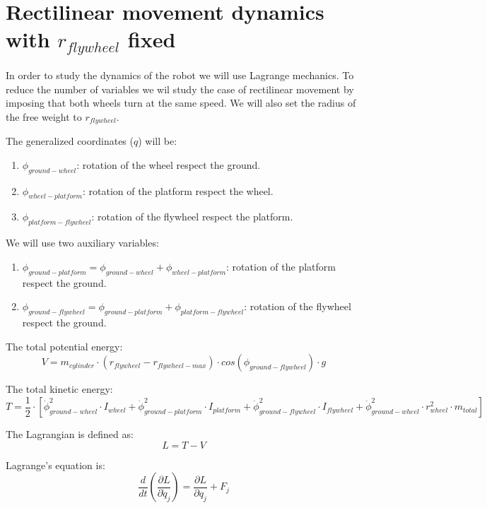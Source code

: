 \section{Rectilinear movement dynamics with $r_{flywheel}$ fixed}

In order to study the dynamics of the robot we will use Lagrange mechanics.
To reduce the number of variables we wil study the case of rectilinear
movement by imposing that both wheels turn at the same speed. We will also set
the radius of the free weight to $r_{flywheel}$.

The generalized coordinates ($q$) will be:
\begin{enumerate}
	\item $\phi_{ground-wheel}$: rotation of the wheel respect the ground.
	\item $\phi_{wheel-platform}$: rotation of the platform respect the wheel.
	\item $\phi_{platform-flywheel}$: rotation of the flywheel respect the platform.
\end{enumerate}

We will use two auxiliary variables:
\begin{enumerate}
	\item $\phi_{ground-platform}=\phi_{ground-wheel}+\phi_{wheel-platform}$: rotation of the platform respect the ground.
	\item $\phi_{ground-flywheel}=\phi_{ground-platform}+\phi_{platform-flywheel}$: rotation of the flywheel respect the ground.
\end{enumerate}

The total potential energy:
\begin{equation}
	V = m_{cylinder}\cdot (r_{flywheel}-r_{flywheel-max}) \cdot cos(\phi_{ground-flywheel}) \cdot g
\end{equation}


The total kinetic energy:
\begin{equation}
	T = \frac{1}{2}\cdot[\dot{\phi}_{ground-wheel}^2\cdot I_{wheel}
		+ \dot{\phi}_{ground-platform}^2 \cdot I_{platform}
		+ \dot{\phi}_{ground-flywheel}^2\cdot I_{flywheel}
		+ \dot{\phi}_{ground-wheel}^2\cdot r_{wheel}^2\cdot m_{total}]
\end{equation}

The Lagrangian is defined as:
\begin{equation}
	L=T-V
\end{equation}

Lagrange's equation is:
\begin{equation}
	\frac{d}{dt}(\frac{\partial L}{\partial \dot{q}_j})=
	\frac{\partial L}{\partial q_j}	+ F_{j}
\end{equation}

